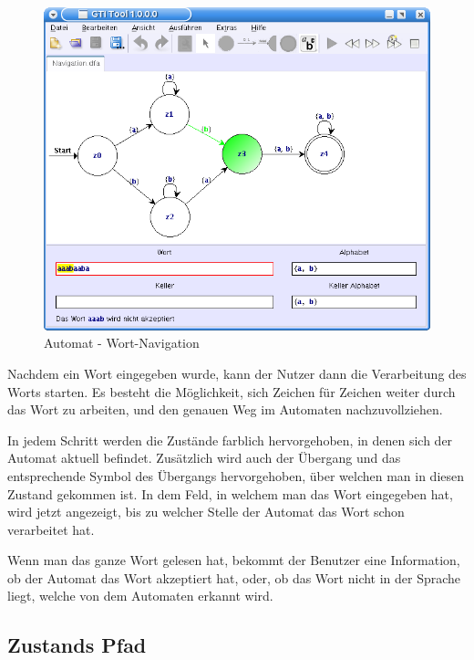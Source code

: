 \begin{figure}[h]
\begin{center}
\includegraphics[width=12cm]{../images/dfa_navigation.png}
\caption{Automat - Wort-Navigation}
\label{FigureWordNavigation}
\end{center}
\end{figure}
\vspace{10pt}

Nachdem ein Wort eingegeben wurde, kann der Nutzer dann die Verarbeitung des
Worts starten. Es besteht die Möglichkeit, sich Zeichen für Zeichen weiter durch
das Wort zu arbeiten, und den genauen Weg im Automaten nachzuvollziehen.\vspace{10pt}

In jedem Schritt werden die Zustände farblich hervorgehoben, in denen sich der
Automat aktuell befindet. Zusätzlich wird auch der Übergang und das
entsprechende Symbol des Übergangs hervorgehoben, über welchen man in diesen
Zustand gekommen ist. In dem Feld, in welchem man das Wort eingegeben hat, wird
jetzt angezeigt, bis zu welcher Stelle der Automat das Wort schon verarbeitet
hat.\vspace{10pt}

Wenn man das ganze Wort gelesen hat, bekommt der Benutzer eine Information,
ob der Automat das Wort akzeptiert hat, oder, ob das Wort nicht in der Sprache
liegt, welche von dem Automaten erkannt wird.\vspace{10pt}


\subsection{Zustands Pfad}\label{HistoryPath}

